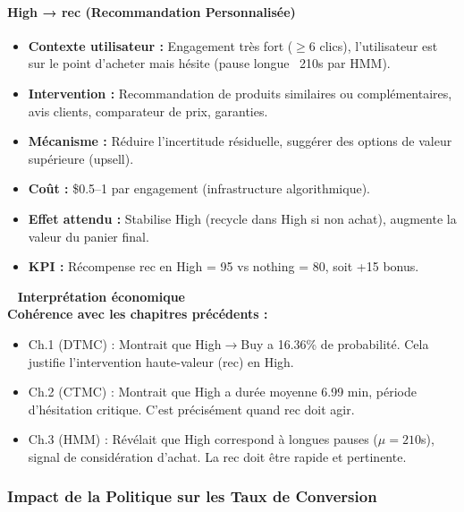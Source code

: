 \documentclass[11pt,a4paper]{article}
\newenvironment{insightbox}{%
  \vspace{3pt}\begin{framed}
  \noindent{\color{NavyBlue}\rule{0.3cm}{3pt}}~%
  \textcolor{NavyBlue}{\textbf{Interprétation économique}}\\[3pt]}
  {\end{framed}\vspace{3pt}}
\begin{document}
\paragraph{High → rec (Recommandation Personnalisée)}
 
\begin{itemize}[leftmargin=1.5cm,itemsep=3pt]
  \item \textbf{Contexte utilisateur :} Engagement très fort ($\geq 6$ clics),
        l'utilisateur est sur le point d'acheter mais hésite (pause longue ~210s par HMM).
  \item \textbf{Intervention :} Recommandation de produits similaires ou complémentaires,
        avis clients, comparateur de prix, garanties.
  \item \textbf{Mécanisme :} Réduire l'incertitude résiduelle,
        suggérer des options de valeur supérieure (upsell).
  \item \textbf{Coût :} \$0.5--1 par engagement (infrastructure algorithmique).
  \item \textbf{Effet attendu :} Stabilise High (recycle dans High si non achat),
        augmente la valeur du panier final.
  \item \textbf{KPI :} Récompense rec en High = 95 vs nothing = 80, soit +15 bonus.
\end{itemize}
 
\begin{insightbox}
\textbf{Cohérence avec les chapitres précédents :}
\begin{itemize}[leftmargin=1.5cm,itemsep=2pt]
  \item Ch.1 (DTMC) : Montrait que High$\to$Buy a 16.36\% de probabilité.
        Cela justifie l'intervention haute-valeur (rec) en High.
  \item Ch.2 (CTMC) : Montrait que High a durée moyenne 6.99 min, période d'hésitation critique.
        C'est précisément quand rec doit agir.
  \item Ch.3 (HMM) : Révélait que High correspond à longues pauses ($\mu=210$s),
        signal de considération d'achat. La rec doit être rapide et pertinente.
\end{itemize}
\end{insightbox}
 
\subsubsection{Impact de la Politique sur les Taux de Conversion}
 
\end{document}
